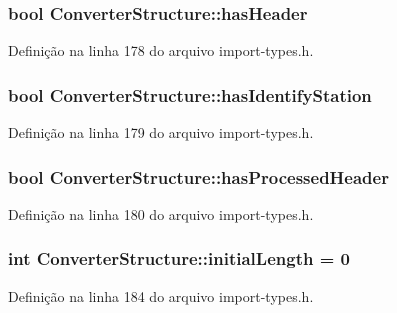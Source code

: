 \subsubsection[{has\+Header}]{\setlength{\rightskip}{0pt plus 5cm}bool Converter\+Structure\+::has\+Header}\label{struct_converter_structure_af9dbe730690acc00120c7ee74dc21518}


Definição na linha 178 do arquivo import-\/types.\+h.

\subsubsection[{has\+Identify\+Station}]{\setlength{\rightskip}{0pt plus 5cm}bool Converter\+Structure\+::has\+Identify\+Station}\label{struct_converter_structure_affecf8a755375e0e506e607b7067abee}


Definição na linha 179 do arquivo import-\/types.\+h.

\subsubsection[{has\+Processed\+Header}]{\setlength{\rightskip}{0pt plus 5cm}bool Converter\+Structure\+::has\+Processed\+Header}\label{struct_converter_structure_ae17c60c03c404841cc8bc9d435ec912f}


Definição na linha 180 do arquivo import-\/types.\+h.

\subsubsection[{initial\+Length}]{\setlength{\rightskip}{0pt plus 5cm}int Converter\+Structure\+::initial\+Length = 0}\label{struct_converter_structure_af97ab7ec01818d24096796523793f9bc}


Definição na linha 184 do arquivo import-\/types.\+h.

